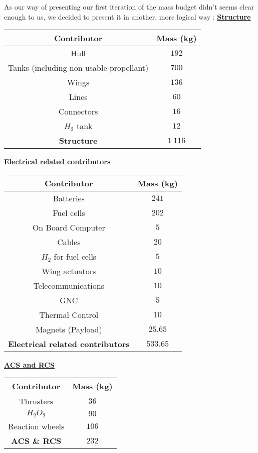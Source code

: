 \qquad As our way of presenting our first iteration of the mass budget didn't seems clear enough to us, we decided to present it in another, more logical way :
\textbf{\underline{Structure}}
\begin{center}
\begin{tabular}[H]{|c|c|}
	\hline
	\cellcolor{gray!50}Contributor & \cellcolor{gray!50}Mass (kg)\\
	\hline
	Hull & $192$\\
	\hline
	Tanks (including non usable propellant) & $700$\\
	\hline
	Wings & $136$\\
	\hline
	Lines & $60$\\
	\hline
	Connectors & $16$\\
	\hline
	$H_2$ tank & $12$\\
	\hline
	\cellcolor{green!30}\textbf{Structure} & \textbf{$1\ 116$}\\
	\hline
\end{tabular}
\end{center}

\textbf{\underline{Electrical related contributors}}
\begin{center}
\begin{tabular}[H]{|c|c|}
	\hline
	\cellcolor{gray!50}Contributor & \cellcolor{gray!50}Mass (kg)\\
	\hline
	Batteries & $241$\\
	\hline
	Fuel cells & $202$\\
	\hline
	On Board Computer & $5$\\
	\hline
	Cables & $20$\\
	\hline
	$H_2$ for fuel cells & $5$\\
	\hline
	Wing actuators & $10$\\
	\hline
	Telecommunications & $10$\\
	\hline
	GNC & $5$\\
	\hline
	Thermal Control & $10$\\
	\hline
	Magnets (Payload) & $25.65$\\
	\hline
	\cellcolor{green!30}\textbf{Electrical related contributors} & \textbf{$533.65$}\\
	\hline
\end{tabular}
\end{center}

\textbf{\underline{ACS and RCS}}
\begin{center}
\begin{tabular}[H]{|c|c|}
	\hline
	\cellcolor{gray!50}Contributor & \cellcolor{gray!50}Mass (kg)\\
	\hline
	Thrusters & $36$\\
	\hline
	$H_2O_2$ & $90$\\
	\hline
	Reaction wheels & $106$\\
	\hline
	\cellcolor{green!30}\textbf{ACS \& RCS} & \textbf{$232$}\\
	\hline
\end{tabular}
\end{center}

